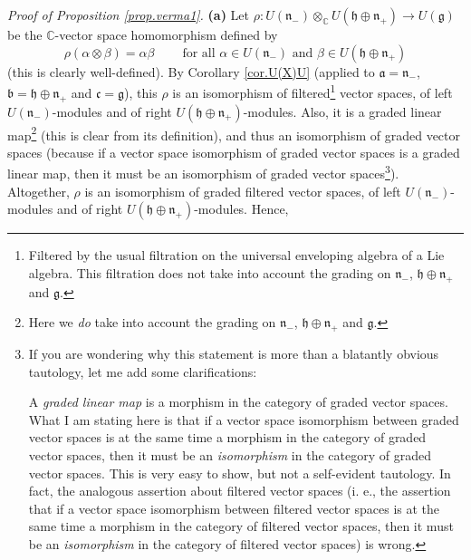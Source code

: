 \documentclass[etingof-lie.tex]{subfiles}
\begin{document}
\textit{Proof of Proposition \ref{prop.verma1}.} \textbf{(a)} Let
$\rho:U\left(  \mathfrak{n}_{-}\right)  \otimes_{\mathbb{C}}U\left(
\mathfrak{h}\oplus\mathfrak{n}_{+}\right)  \rightarrow U\left(  \mathfrak{g}%
\right)  $ be the $\mathbb{C}$-vector space homomorphism defined by%
\[
\rho\left(  \alpha\otimes\beta\right)  =\alpha\beta
\ \ \ \ \ \ \ \ \ \ \text{for all }\alpha\in U\left(  \mathfrak{n}_{-}\right)
\text{ and }\beta\in U\left(  \mathfrak{h}\oplus\mathfrak{n}_{+}\right)
\]
(this is clearly well-defined). By Corollary \ref{cor.U(X)U} (applied to
$\mathfrak{a}=\mathfrak{n}_{-}$, $\mathfrak{b}=\mathfrak{h}\oplus
\mathfrak{n}_{+}$ and $\mathfrak{c}=\mathfrak{g}$), this $\rho$ is an
isomorphism of filtered\footnote{Filtered by the usual filtration on the
universal enveloping algebra of a Lie algebra. This filtration does not take
into account the grading on $\mathfrak{n}_{-}$, $\mathfrak{h}\oplus
\mathfrak{n}_{+}$ and $\mathfrak{g}$.} vector spaces, of left $U\left(
\mathfrak{n}_{-}\right)  $-modules and of right $U\left(  \mathfrak{h}%
\oplus\mathfrak{n}_{+}\right)  $-modules. Also, it is a graded linear
map\footnote{Here we \textit{do} take into account the grading on
$\mathfrak{n}_{-}$, $\mathfrak{h}\oplus\mathfrak{n}_{+}$ and $\mathfrak{g}$.}
(this is clear from its definition), and thus an isomorphism of graded vector
spaces (because if a vector space isomorphism of graded vector spaces is a
graded linear map, then it must be an isomorphism of graded vector
spaces\footnote{If you are wondering why this statement is more than a
blatantly obvious tautology, let me add some clarifications:
\par
A \textit{graded linear map} is a morphism in the category of graded vector
spaces. What I am stating here is that if a vector space isomorphism between
graded vector spaces is at the same time a morphism in the category of graded
vector spaces, then it must be an \textit{isomorphism} in the category of
graded vector spaces. This is very easy to show, but not a self-evident
tautology. In fact, the analogous assertion about filtered vector spaces (i.
e., the assertion that if a vector space isomorphism between filtered vector
spaces is at the same time a morphism in the category of filtered vector
spaces, then it must be an \textit{isomorphism} in the category of filtered
vector spaces) is wrong.}). Altogether, $\rho$ is an isomorphism of graded
filtered vector spaces, of left $U\left(  \mathfrak{n}_{-}\right)  $-modules
and of right $U\left(  \mathfrak{h}\oplus\mathfrak{n}_{+}\right)  $-modules.
Hence,%
\end{document}
